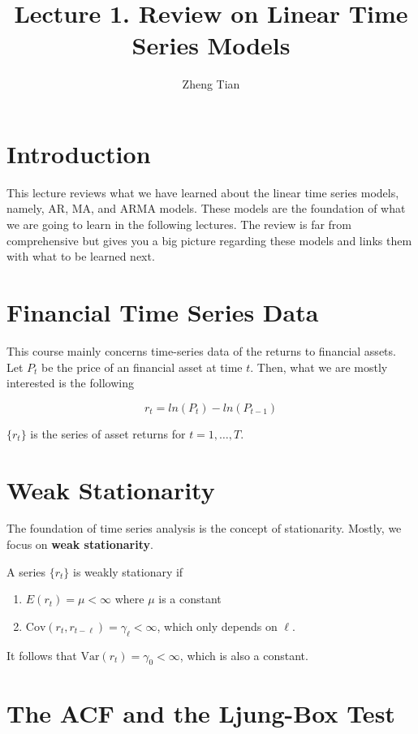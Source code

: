 \documentclass[a4paper,11pt]{article}
\author{Zheng Tian}
\date{}
\title{Lecture 1. Review on Linear Time Series Models}
\newcommand{\var}{\mathrm{Var}}
\newcommand{\cov}{\mathrm{Cov}}
\begin{document}
\maketitle
\setcounter{tocdepth}{2}
\tableofcontents



\section{Introduction}
\label{sec:org2bbc387}

This lecture reviews what we have learned about the linear time series
models, namely, AR, MA, and ARMA models. These models are the
foundation of what we are going to learn in the following lectures. The
review is far from comprehensive but gives you a big picture regarding
these models and links them with what to be learned next.


\section{Financial Time Series Data}
\label{sec:org511a9a9}

This course mainly concerns time-series data of the returns to
financial assets. Let \(P_t\) be the price of an financial asset at time
\(t\). Then, what we are mostly interested is the following

\[ r_t = ln(P_t) - ln(P_{t-1}) \]

\(\{r_t\}\) is the series of asset returns for \(t = 1, \ldots, T\).


\section{Weak Stationarity}
\label{sec:org7fd5e26}

The foundation of time series analysis is the concept of stationarity. Mostly, we
focus on \textbf{weak stationarity}.

A series \(\{r_t\}\) is weakly stationary if
\begin{enumerate}
\item \(E(r_t) = \mu < \infty\) where \(\mu\) is a constant
\item \(\cov(r_t, r_{t-\ell}) = \gamma_{\ell} < \infty\), which only depends on \(\ell\).
\end{enumerate}

It follows that \(\var(r_t) = \gamma_0 < \infty\), which is also a
constant.


\section{The ACF and the Ljung-Box Test}
\label{sec:org9d00fa4}
\end{document}
